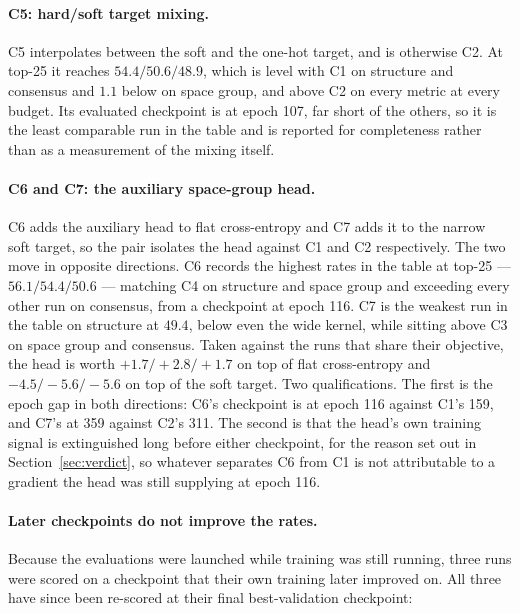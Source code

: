 \documentclass[manuscript,screen,review]{acmart}
\begin{document}
\paragraph{C5: hard/soft target mixing.}
C5 interpolates between the soft and the one-hot target, and is otherwise C2. At
top-25 it reaches $54.4 / 50.6 / 48.9$, which is level with C1 on structure and
consensus and $1.1$ below on space group, and above C2 on every metric at every
budget. Its evaluated checkpoint is at epoch 107, far short of the others, so it
is the least comparable run in the table and is reported for completeness rather
than as a measurement of the mixing itself.

\paragraph{C6 and C7: the auxiliary space-group head.}
C6 adds the auxiliary head to flat cross-entropy and C7 adds it to the narrow
soft target, so the pair isolates the head against C1 and C2 respectively. The
two move in opposite directions. C6 records the highest rates in the table at
top-25 --- $56.1 / 54.4 / 50.6$ --- matching C4 on structure and space group and
exceeding every other run on consensus, from a checkpoint at epoch 116. C7 is the
weakest run in the table on structure at $49.4$, below even the wide kernel, while
sitting above C3 on space group and consensus. Taken against the runs that share
their objective, the head is worth $+1.7 / +2.8 / +1.7$ on top of flat
cross-entropy and $-4.5 / -5.6 / -5.6$ on top of the soft target. Two
qualifications. The first is the epoch gap in both directions: C6's checkpoint is
at epoch 116 against C1's 159, and C7's at 359 against C2's 311. The second is
that the head's own training signal is extinguished long before either
checkpoint, for the reason set out in Section~\ref{sec:verdict}, so whatever
separates C6 from C1 is not attributable to a gradient the head was still
supplying at epoch 116.

\paragraph{Later checkpoints do not improve the rates.}
Because the evaluations were launched while training was still running, three
runs were scored on a checkpoint that their own training later improved on. All
three have since been re-scored at their final best-validation checkpoint:
\end{document}
